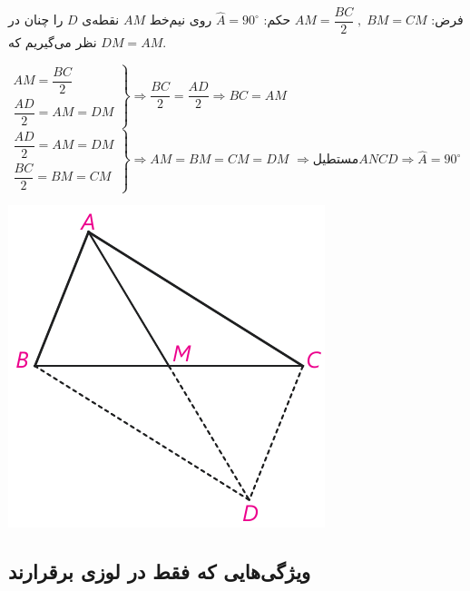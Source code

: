 \documentclass[12pt, a4paper]{book}
\begin{document}
  \begin{minipage}{.65\textwidth}
 	\centering فرض: 
 	$
 	 AM = \dfrac{BC}{2} \; , \; BM = CM
 	$
 	\qquad حکم:
 	$ 
 	\widehat{A} = 90^{\circ}
 	$
 	\newline
 	روی نیم‌خط $AM$ نقطه‌ی $D$ را چنان در نظر می‌گیریم که $DM = AM$.
 	\begin{flushleft}
 		$ 
	 		\left. 
		 		\begin{array}{crr}
		 			AM = \dfrac{BC}{2} \\
		 			\dfrac{AD}{2} = AM = DM
		 		\end{array}
	 		\right\}
	 		\Rightarrow \dfrac{BC}{2} = \dfrac{AD}{2} \Rightarrow BC =AM 
 		$
 		$
			\left. 
	 			\begin{array}{crr}
	 				\dfrac{AD}{2} =  AM = DM\\
	 				\dfrac{BC}{2} = BM = CM
	 			\end{array}
			\right\}
 			\Rightarrow AM = BM = CM = DM
 		$
 		$
 			\Rightarrow \mbox{مستطیل‌} ANCD \Rightarrow \widehat{A} = 90^{\circ}
 		$
 		
 	\end{flushleft}
 \end{minipage}
 \begin{minipage}{.34\textwidth}
 	\begin{flushleft}
 		\includegraphics{"Shapes/Fasl - 3/Dars 1/2-2.2.pdf"}
 	\end{flushleft}
 \end{minipage}
 

\subsection{ویژگی‌هایی که فقط در لوزی برقرارند}
\end{document}
